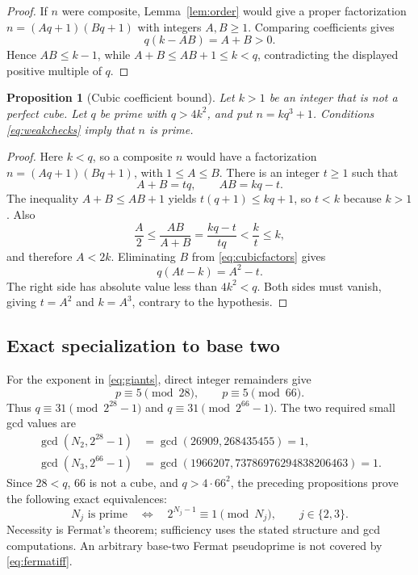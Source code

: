 \documentclass[11pt,a4paper]{article}
\newtheorem{proposition}[theorem]{Proposition}
\theoremstyle{definition}
\begin{document}
\begin{proof}
If $n$ were composite, Lemma~\ref{lem:order} would give a proper
factorization $n=(Aq+1)(Bq+1)$ with integers $A,B\ge1$. Comparing
coefficients gives
\[
 q(k-AB)=A+B>0.
\]
Hence $AB\le k-1$, while
$A+B\le AB+1\le k<q$, contradicting the displayed positive multiple of $q$.
\end{proof}

\begin{proposition}[Cubic coefficient bound]\label{prop:cubiccriterion}
Let $k>1$ be an integer that is not a perfect cube. Let $q$ be prime with
$q>4k^2$, and put $n=kq^3+1$. Conditions \eqref{eq:weakchecks} imply that
$n$ is prime.
\end{proposition}

\begin{proof}
Here $k<q$, so a composite $n$ would have a factorization
$n=(Aq+1)(Bq+1)$, with $1\le A\le B$. There is an integer $t\ge1$ such that
\begin{equation}\label{eq:cubicfactors}
 A+B=tq,\qquad AB=kq-t.
\end{equation}
The inequality $A+B\le AB+1$ yields $t(q+1)\le kq+1$, so $t<k$ because
$k>1$. Also
\[
 \frac A2\le\frac{AB}{A+B}=\frac{kq-t}{tq}<\frac{k}{t}\le k,
\]
and therefore $A<2k$. Eliminating $B$ from \eqref{eq:cubicfactors} gives
\[
 q(At-k)=A^2-t.
\]
The right side has absolute value less than $4k^2<q$. Both sides must
vanish, giving $t=A^2$ and $k=A^3$, contrary to the hypothesis.
\end{proof}

\subsection{Exact specialization to base two}

For the exponent in \eqref{eq:giants}, direct integer remainders give
\[
 p\equiv5\pmod{28},\qquad p\equiv5\pmod{66}.
\]
Thus $q\equiv31\pmod{2^{28}-1}$ and $q\equiv31\pmod{2^{66}-1}$.
The two required small gcd values are
\begin{align}
 \gcd(N_2,2^{28}-1)
 &=\gcd(26909,268435455)=1,\label{eq:gcd28}\\
 \gcd(N_3,2^{66}-1)
 &=\gcd(1966207,73786976294838206463)=1.\label{eq:gcd66}
\end{align}
Since $28<q$, $66$ is not a cube, and $q>4\cdot66^2$, the preceding
propositions prove the following exact equivalences:
\begin{equation}\label{eq:fermatiff}
 \boxed{\quad
 N_j\text{ is prime}\quad\Longleftrightarrow\quad
 2^{N_j-1}\equiv1\pmod{N_j},\qquad j\in\{2,3\}.
 \quad}
\end{equation}
Necessity is Fermat's theorem; sufficiency uses the stated structure and
gcd computations. An arbitrary base-two Fermat pseudoprime is not covered
by \eqref{eq:fermatiff}.
\end{document}
